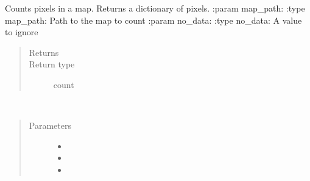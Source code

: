 \documentclass[letterpaper,10pt,english]{sphinxmanual}
\begin{document}
\begin{fulllineitems}
\label{\detokenize{index:pyeo.validation.count_pixel_classes}}
Counts pixels in a map. Returns a dictionary of pixels.
:param map\_path:
:type map\_path: Path to the map to count
:param no\_data:
:type no\_data: A value to ignore
\begin{quote}\begin{description}
\item[{Returns}] \leavevmode
{}

\item[{Return type}] \leavevmode
count

\end{description}\end{quote}

\end{fulllineitems}


\begin{fulllineitems}
\label{\detokenize{index:pyeo.validation.part_fixed_value_sampling}}~\begin{quote}\begin{description}
\item[{Parameters}] \leavevmode\begin{itemize}
\item {} 
 \textendash{} 

\item {} 
 \textendash{} 

\item {} 
 \textendash{} 

\end{itemize}

\end{description}\end{quote}

\end{fulllineitems}
\end{document}
